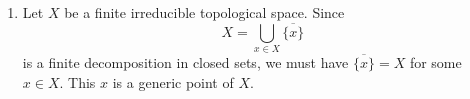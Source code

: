 \newcommand{\sheet}{4}




\maketitle{}

\begin{exercise}{1}
    
    \begin{enumerate}
        \item{Let $X$ be a finite irreducible topological space. Since
            \begin{equation*}
                X = \bigcup_{x \in X} \overline{\{x\}}
            \end{equation*}
            is a finite decomposition in closed sets, we must have
            $\overline{\{x\}} = X$ for some $x \in X$. This $x$ is a generic
            point of $X$.

}
\end{enumerate}
\end{exercise}
